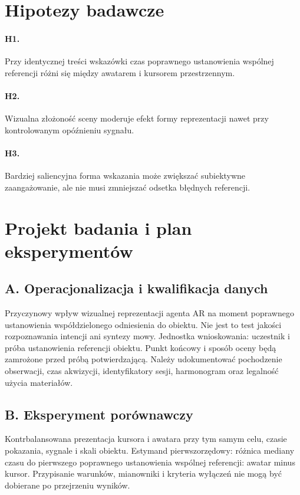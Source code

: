 \documentclass[11pt,a4paper]{article}
\begin{document}
\section{Hipotezy badawcze}
\paragraph{H1.} Przy identycznej treści wskazówki czas poprawnego ustanowienia wspólnej referencji różni się między awatarem i kursorem przestrzennym.
\paragraph{H2.} Wizualna złożoność sceny moderuje efekt formy reprezentacji nawet przy kontrolowanym opóźnieniu sygnału.
\paragraph{H3.} Bardziej saliencyjna forma wskazania może zwiększać subiektywne zaangażowanie, ale nie musi zmniejszać odsetka błędnych referencji.

\section{Projekt badania i plan eksperymentów}
\subsection{A. Operacjonalizacja i kwalifikacja danych}
Przyczynowy wpływ wizualnej reprezentacji agenta AR na moment poprawnego ustanowienia współdzielonego odniesienia do obiektu. Nie jest to test jakości rozpoznawania intencji ani syntezy mowy. Jednostka wnioskowania: uczestnik i próba ustanowienia referencji obiektu. Punkt końcowy i sposób oceny będą zamrożone przed próbą potwierdzającą. Należy udokumentować pochodzenie obserwacji, czas akwizycji, identyfikatory sesji, harmonogram oraz legalność użycia materiałów.

\subsection{B. Eksperyment porównawczy}
Kontrbalansowana prezentacja kursora i awatara przy tym samym celu, czasie pokazania, sygnale i skali obiektu. Estymand pierwszorzędowy: różnica mediany czasu do pierwszego poprawnego ustanowienia wspólnej referencji: awatar minus kursor. Przypisanie warunków, mianowniki i kryteria wyłączeń nie mogą być dobierane po przejrzeniu wyników.
\end{document}
